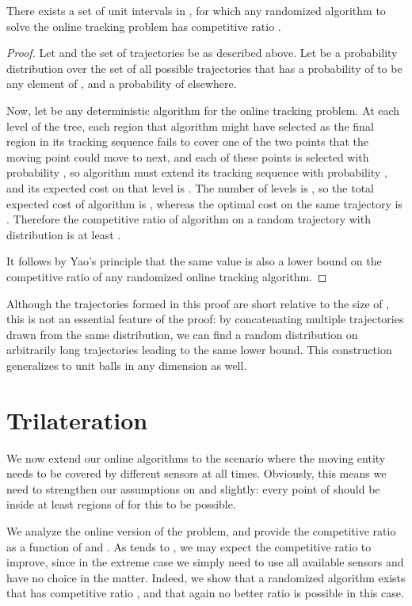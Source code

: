 \documentclass[runningheads]{llncs}
\begin{document}
\begin {theorem} \label {thm:lowerbound_random}
There exists a set  of unit intervals in , for which any randomized algorithm to solve the online tracking problem has competitive ratio .
\end {theorem}
      
\begin {proof}
Let  and the set of trajectories  be as described above. Let  be a probability distribution over the set of all possible trajectories that has a probability of  to be any element of , and a probability of  elsewhere.
        
Now, let  be any deterministic algorithm for the online tracking problem.  At each level of the tree, each region  that algorithm  might have selected as the final region in its tracking sequence fails to cover one of the two points that the moving point could move to next, and each of these points is selected with probability , so algorithm  must extend its tracking sequence with probability , and its expected cost on that level is . The number of levels is , so the total expected cost of algorithm  is , whereas the optimal cost on the same trajectory is . Therefore the competitive ratio of algorithm  on a random trajectory with distribution  is at least .

It follows by Yao's principle that the same value  is also a lower bound on the competitive ratio of any randomized online tracking algorithm.
\end {proof}

Although the trajectories formed in this proof are short relative to the size of , this is not an essential feature of the proof: by concatenating multiple trajectories drawn from the same distribution, we can find a random distribution on arbitrarily long trajectories leading to the same  lower bound.
This construction generalizes to unit balls in any dimension  as well.
  
    
\section{Trilateration}

 
  We now extend our online algorithms to the scenario where the moving entity needs to be covered by  different sensors at all times. Obviously, this means we need to strengthen our assumptions on  and  slightly: every point of  should be inside at least  regions of  for this to be possible. 
  
  We analyze the online version of the problem, and provide the competitive ratio as a function of  and . As  tends to , we may expect the competitive ratio to improve, since in the extreme case we simply need to use all available sensors and have no choice in the matter. Indeed, we show that a randomized algorithm exists that has competitive ratio , and that again no better ratio is possible in this case.
  
\end{document}
